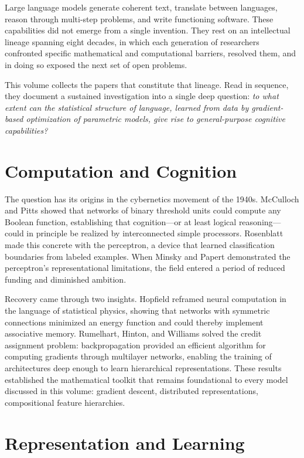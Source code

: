 
Large language models generate coherent text, translate between languages, reason through multi-step problems, and write functioning software. These capabilities did not emerge from a single invention. They rest on an intellectual lineage spanning eight decades, in which each generation of researchers confronted specific mathematical and computational barriers, resolved them, and in doing so exposed the next set of open problems.

This volume collects the papers that constitute that lineage. Read in sequence, they document a sustained investigation into a single deep question: \textit{to what extent can the statistical structure of language, learned from data by gradient-based optimization of parametric models, give rise to general-purpose cognitive capabilities?}

\section*{Computation and Cognition}

The question has its origins in the cybernetics movement of the 1940s. McCulloch and Pitts showed that networks of binary threshold units could compute any Boolean function, establishing that cognition---or at least logical reasoning---could in principle be realized by interconnected simple processors. Rosenblatt made this concrete with the perceptron, a device that learned classification boundaries from labeled examples. When Minsky and Papert demonstrated the perceptron's representational limitations, the field entered a period of reduced funding and diminished ambition.

Recovery came through two insights. Hopfield reframed neural computation in the language of statistical physics, showing that networks with symmetric connections minimized an energy function and could thereby implement associative memory. Rumelhart, Hinton, and Williams solved the credit assignment problem: backpropagation provided an efficient algorithm for computing gradients through multilayer networks, enabling the training of architectures deep enough to learn hierarchical representations. These results established the mathematical toolkit that remains foundational to every model discussed in this volume: gradient descent, distributed representations, compositional feature hierarchies.

\section*{Representation and Learning}


